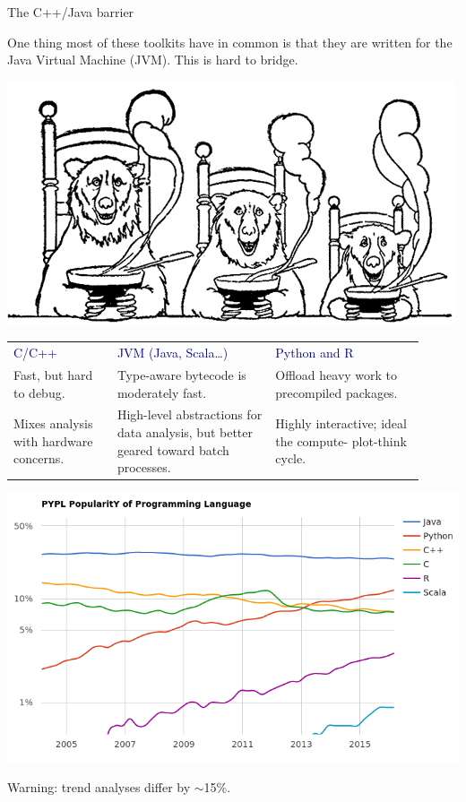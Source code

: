 \documentclass{beamer}
\begin{document}
\begin{frame}{The C++/Java barrier}

\vspace{0.2 cm}
One thing most of these toolkits have in common is that they are written for the Java Virtual Machine (JVM). This is hard to bridge.

\begin{center}
\includegraphics[width=0.5\linewidth]{three_bears.png}
\end{center}

\renewcommand{\arraystretch}{1.2} \begin{tabular}{>{\raggedright}p{0.23\linewidth} >{\raggedright}p{0.35\linewidth} >{\raggedright\arraybackslash}p{0.33\linewidth}}
\textcolor{darkblue}{C/C++} & \textcolor{darkblue}{JVM (Java, Scala\ldots)} & \textcolor{darkblue}{Python and R} \\
\vspace{-0.4 cm} Fast, but hard to debug. & \vspace{-0.4 cm} Type-aware bytecode is moderately fast. & \vspace{-0.4 cm} Offload heavy work to precompiled packages. \\
Mixes analysis with hardware concerns. & High-level abstractions for data analysis, but better geared toward batch processes. & Highly interactive; ideal the compute- plot-think cycle.
\end{tabular}
\end{frame}

\begin{frame}{}
\vfill
\includegraphics[width=\linewidth]{language_trends.png}

\vfill
Warning: trend analyses differ by $\sim$15\%.
\end{frame}
\end{document}
